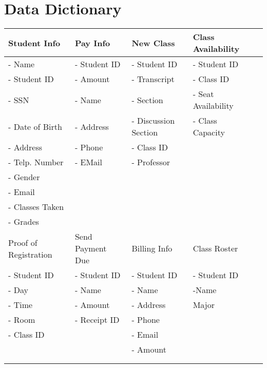 \section{Data Dictionary}

\begin{center}
    \begin{tabular}{ | l | l | l |l| p{5cm} |}
   \hline
    Student Info & Pay Info & New Class & Class Availability \\ \hline
   - Name          &  - Student ID &  - Student ID           & - Student ID  \\
    - Student ID    &  - Amount     &  - Transcript           & - Class ID  \\ 
    - SSN           &  - Name       &  - Section              & - Seat Availability\\ 
    - Date of Birth &  - Address    &  - Discussion Section   & - Class Capacity   \\ 
    - Address       &  - Phone      &  - Class ID             &   \\ 
    - Telp. Number  &  - EMail      &  - Professor            &   \\ 
    - Gender        &               &                         &   \\ 
    - Email         &               &                         &   \\ 
    - Classes Taken &               &                         &   \\ 
    - Grades        &               &                         &\\ \hline

    
       
    
Proof of Registration & Send Payment Due & Billing Info & Class Roster\\ \hline
       - Student ID   &  - Student ID    &  - Student ID& - Student ID  \\ 
       - Day          &  - Name          &  - Name      & -Name\\
       - Time         &  - Amount        &  - Address   & Major   \\ 
       - Room         &  - Receipt ID    &  - Phone     &   \\ 
       - Class ID     &                  &    - Email   & \\ 
                      &                  &    - Amount  & \\
                      &                  &              &   \\ 
                      &                  &               &\\ \hline

    
    \hline
    \end{tabular}
\end{center}

